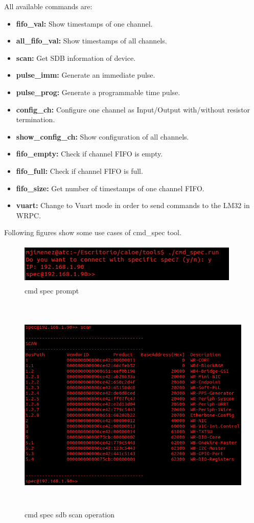 All available commands are:

\begin{itemize}
 \item {\textbf{fifo\_val: }Show timestamps of one channel.}
 \item {\textbf{all\_fifo\_val: }Show timestamps of all channels.}
 \item {\textbf{scan: }Get SDB information of device.}
 \item {\textbf{pulse\_imm: }Generate an immediate pulse.}
 \item {\textbf{pulse\_prog: }Generate a programmable time pulse.}
 \item {\textbf{config\_ch: }Configure one channel as Input/Output with/without resistor termination.}
 \item {\textbf{show\_config\_ch: }Show configuration of all channels.}
 \item {\textbf{fifo\_empty: }Check if channel FIFO is empty.}
 \item {\textbf{fifo\_full: }Check if channel FIFO is full.}
 \item {\textbf{fifo\_size: }Get number of timestamps of one channel FIFO.}
 \item {\textbf{vuart: }Change to Vuart mode in order to send commands to the LM32 in WRPC.}
\end{itemize}

Following figures show some use cases of cmd\_spec tool.

\begin{figure}[H]
\centering
\includegraphics[width=400px,height=75px]{img/cmd_spec_prompt.png}
\caption{cmd spec prompt}
\label{cmd_spec_prompt_img}
\end{figure}

\begin{figure}[H]
\centering
\includegraphics[width=500px,height=400px]{img/cmd_spec_scan_sdb.png}
\caption{cmd spec sdb scan operation}
\label{cmd_spec_scan_img}
\end{figure}

